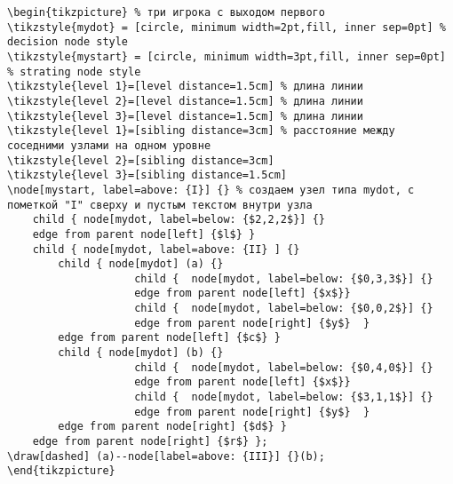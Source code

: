 \documentclass[12pt,a4paper]{article}
\begin{document}
\begin{verbatim}
\begin{tikzpicture} % три игрока с выходом первого
\tikzstyle{mydot} = [circle, minimum width=2pt,fill, inner sep=0pt] % decision node style
\tikzstyle{mystart} = [circle, minimum width=3pt,fill, inner sep=0pt] % strating node style
\tikzstyle{level 1}=[level distance=1.5cm] % длина линии
\tikzstyle{level 2}=[level distance=1.5cm] % длина линии
\tikzstyle{level 3}=[level distance=1.5cm] % длина линии
\tikzstyle{level 1}=[sibling distance=3cm] % расстояние между соседними узлами на одном уровне
\tikzstyle{level 2}=[sibling distance=3cm]
\tikzstyle{level 3}=[sibling distance=1.5cm]
\node[mystart, label=above: {I}] {} % создаем узел типа mydot, с пометкой "I" сверху и пустым текстом внутри узла
    child { node[mydot, label=below: {$2,2,2$}] {}
    edge from parent node[left] {$l$} }
    child { node[mydot, label=above: {II} ] {}
        child { node[mydot] (a) {}
                    child {  node[mydot, label=below: {$0,3,3$}] {}
                    edge from parent node[left] {$x$}}
                    child {  node[mydot, label=below: {$0,0,2$}] {}
                    edge from parent node[right] {$y$}  }
        edge from parent node[left] {$c$} }
        child { node[mydot] (b) {}
                    child {  node[mydot, label=below: {$0,4,0$}] {}
                    edge from parent node[left] {$x$}}
                    child {  node[mydot, label=below: {$3,1,1$}] {}
                    edge from parent node[right] {$y$}  }
        edge from parent node[right] {$d$} }
    edge from parent node[right] {$r$} };
\draw[dashed] (a)--node[label=above: {III}] {}(b);
\end{tikzpicture}

\end{verbatim}



\newpage
{}

 
\end{document}
